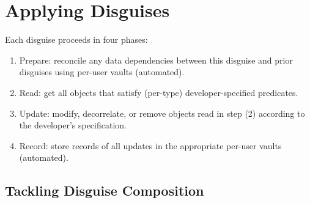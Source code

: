 \section{Applying Disguises}
\label{sec:composition}
Each disguise proceeds in four phases:
\begin{enumerate}
    \item Prepare: reconcile any data dependencies between this disguise and prior disguises using per-user vaults (automated).
    \item Read: get all objects that satisfy (per-type) developer-specified predicates.
    \item Update: modify, decorrelate, or remove objects read in step (2) according to the
        developer's specification.
    \item Record: store records of all updates in the appropriate per-user vaults (automated).
\end{enumerate}

\subsection{Tackling Disguise Composition}
\label{sec:composition}


\iffalse
\sys also handles user data management and storage.
While unsubscribing a user, \sys tracks all deletions and modifications to the database.
\sys encrypts this log with a per-user key, and stores this encrypted
blob in a dedicated application datastore (Figure~\ref{fig:arch}, step 5). The user key is secret-shared using a (2, 3)
threshold scheme~\cite{secretsharing} between the user, \sys, and a trusted third party (\eg
Amazon S3), so that the user can authorize \sys and the third party to restore the key if
the user forgets their share.
The user can optionally choose to store this encrypted data themselves
and be in charge of providing their data and key to \sys to decrypt the data upon
resubscription.

To resubscribe, a user authorizes the decryption of their data and associated metadata by
providing their share of the key (or authorizing a trusted third party to reconstruct the secret
with the application). \sys decrypts the data with the key, and systematically reverses
the modifications made during unsubscription, restoring removed entities and correlations between
entities.
\fi
